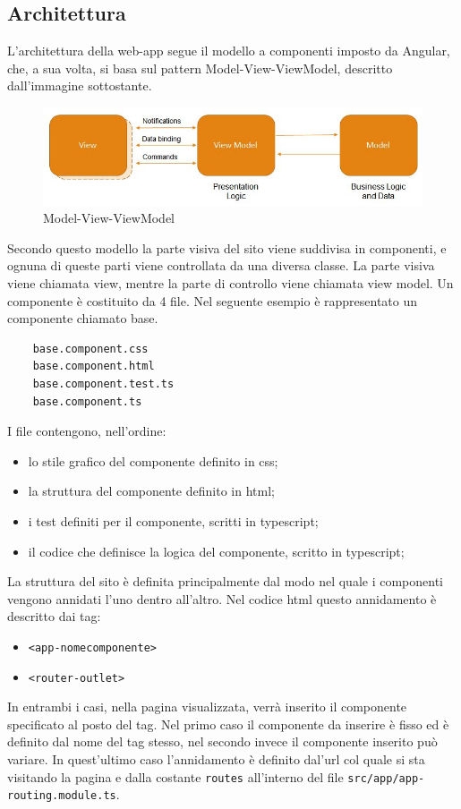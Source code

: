 \subsection{Architettura}
L'architettura della web-app segue il modello a componenti imposto da Angular, che, a sua volta, si basa sul pattern Model-View-ViewModel, descritto dall'immagine sottostante.
\begin{figure}[H]
	\centering
	\includegraphics[width=15cm]{res/images/mvvm.jpg}
	\caption{Model-View-ViewModel}
	\label{fig:Model-View-ViewModel}
\end{figure}
Secondo questo modello la parte visiva del sito viene suddivisa in componenti, e ognuna di queste parti viene controllata da una diversa classe.
La parte visiva viene chiamata view, mentre la parte di controllo viene chiamata view model.
Un componente è costituito da 4 file. Nel seguente esempio è rappresentato un componente chiamato base.
\begin{verbatim}
	base.component.css
	base.component.html
	base.component.test.ts
	base.component.ts
\end{verbatim}
I file contengono, nell'ordine:
\begin{itemize}
	\item lo stile grafico del componente definito in css;
	\item la struttura del componente definito in html;
	\item i test definiti per il componente, scritti in typescript;
	\item il codice che definisce la logica del componente, scritto in typescript;
\end{itemize}

La struttura del sito è definita principalmente dal modo nel quale i componenti vengono annidati l'uno dentro all'altro. Nel codice html questo annidamento è descritto dai tag:
\begin{itemize}
	\item \texttt{<app-nomecomponente>}
	\item \texttt{<router-outlet>}
\end{itemize}
In entrambi i casi, nella pagina visualizzata, verrà inserito il componente specificato al posto del tag. Nel primo caso il componente da inserire è fisso ed è definito dal nome del tag stesso, nel secondo invece il componente inserito può variare. In quest'ultimo caso l'annidamento è definito dal'url col quale si sta visitando la pagina e dalla costante \texttt{routes} all'interno del file \texttt{src/app/app-routing.module.ts}.

